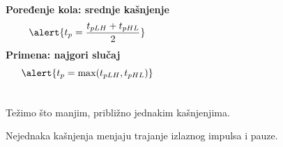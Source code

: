 \begin{frame}[label=08-s037]
\begin{columns}[T,onlytextwidth]
\textbf{Poređenje kola: srednje kašnjenje}
\[\alert{t_p=\frac{t_{pLH}+t_{pHL}}2}\]
\textbf{Primena: najgori slučaj}
\[\alert{t_p=\max(t_{pLH},t_{pHL})}\]
\end{columns}\bigskip
Težimo što manjim, približno jednakim kašnjenjima.\par\medskip
Nejednaka kašnjenja menjaju trajanje izlaznog impulsa i pauze.
\end{frame}
